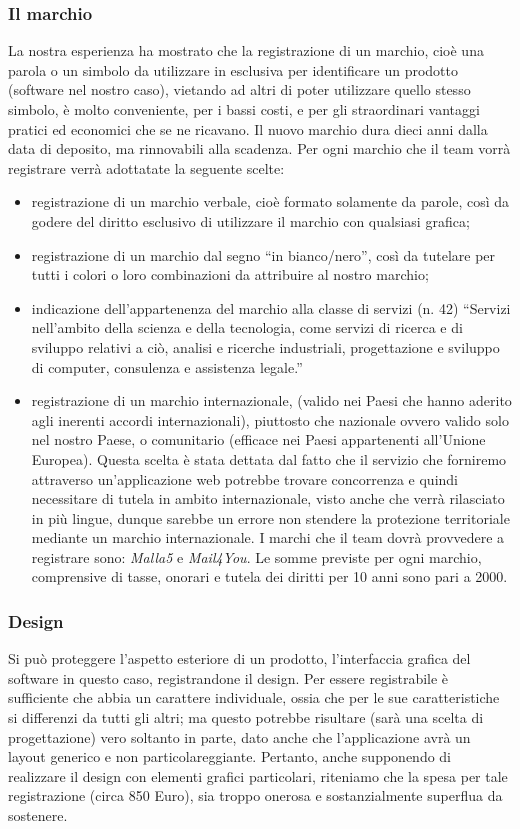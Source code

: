 \subsubsection{Il marchio}
La nostra esperienza ha mostrato che la registrazione di un marchio, cioè una parola o un simbolo da utilizzare in esclusiva per identificare un prodotto (software nel nostro caso), vietando ad altri di poter utilizzare quello stesso simbolo, è molto conveniente, per i bassi costi, e per gli straordinari vantaggi pratici ed economici che se ne ricavano. Il nuovo marchio dura dieci anni dalla data di deposito, ma rinnovabili alla scadenza. Per ogni marchio che il team vorrà registrare verrà adottatate la seguente scelte:
\begin{itemize}
\item registrazione di un marchio verbale, cioè formato solamente da parole, così da godere del diritto esclusivo di utilizzare il marchio con qualsiasi grafica;
\item registrazione di un marchio dal segno ``in bianco/nero'', così da tutelare per tutti i colori o loro combinazioni da attribuire al nostro marchio;
\item indicazione dell'appartenenza del marchio alla classe di servizi (n. 42) ``Servizi nell'ambito della scienza e della tecnologia, come servizi di ricerca e di sviluppo relativi a ciò, analisi e ricerche industriali, progettazione e sviluppo di computer, consulenza e assistenza legale.''
\item registrazione di un marchio internazionale, (valido nei Paesi che hanno aderito agli inerenti accordi internazionali), piuttosto che nazionale ovvero valido solo nel nostro Paese, o  comunitario (efficace nei Paesi appartenenti all'Unione Europea). Questa scelta è stata dettata dal fatto che il servizio che forniremo attraverso un'applicazione web potrebbe trovare concorrenza e quindi necessitare di tutela in ambito internazionale, visto anche che verrà rilasciato in più lingue, dunque sarebbe un errore non stendere la protezione territoriale mediante un marchio internazionale.
I marchi che il team dovrà provvedere a registrare sono: \textit{Malla5} e \textit{Mail4You}. Le somme previste per ogni marchio, comprensive di tasse, onorari e tutela dei diritti per 10 anni sono pari a 2000\officialeuro.
\end{itemize}

\subsubsection{Design}
Si può proteggere l'aspetto esteriore di un prodotto, l'interfaccia grafica del software in questo caso, registrandone il design. Per essere registrabile è sufficiente che abbia un carattere individuale, ossia che per le sue caratteristiche si differenzi da tutti gli altri; ma questo potrebbe risultare (sarà una scelta di progettazione) vero soltanto in parte, dato anche che l'applicazione avrà un layout generico e non particolareggiante. Pertanto, anche supponendo di realizzare il design con elementi grafici particolari, riteniamo che la spesa per tale registrazione (circa 850 Euro), sia troppo onerosa e sostanzialmente superflua da sostenere.

